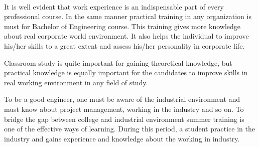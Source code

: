 \newpage
\thispagestyle{empty}

\begin{center}
\\[1.5cm]
\begin{flushleft}
It is well evident that work experience is an indispensable part of every professional course. In the same manner practical training in any organization is must for Bachelor of Engineering course. This training gives more knowledge about real corporate world environment. It also helps the individual to improve his/her skills to a great extent and assess his/her personality in corporate life.

\setlength{\parindent}{3ex} 
Classroom study is quite important for gaining theoretical knowledge, but practical knowledge is equally important for the candidates to improve skills in real working environment in any field of study.

\setlength{\parindent}{3ex}
To be a good engineer, one must be aware of the industrial environment and must know about project management, working in the industry and so on. To bridge the gap between college and industrial environment summer training is one of the effective ways of learning. During this period, a student practice in the industry and gains experience and knowledge about the working in industry.

\end{flushleft}
\end{center}

\vfill
